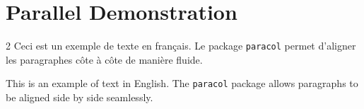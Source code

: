 \documentclass[openany]{book}
\begin{document}
\chapter{Parallel Demonstration}

\begin{paracol}{2}
  Ceci est un exemple de texte en français. Le package \texttt{paracol} 
  permet d'aligner les paragraphes côte à côte de manière fluide.

  \switchcolumn %

  This is an example of text in English. The \texttt{paracol} package 
  allows paragraphs to be aligned side by side seamlessly.
\end{paracol}
\end{document}
